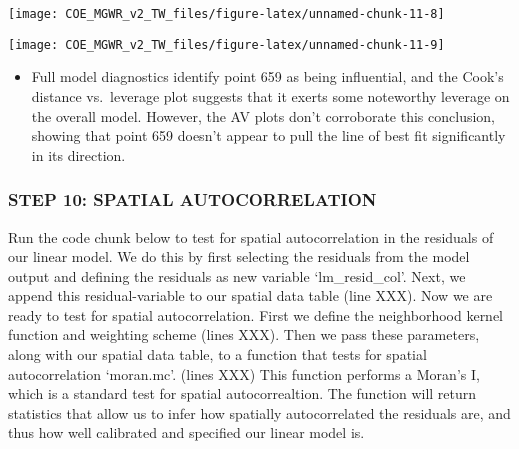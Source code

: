 \documentclass[
  12pt,
]{article}
\providecommand{\tightlist}{%
  \setlength{\itemsep}{0pt}\setlength{\parskip}{0pt}}
\begin{document}
\begin{center}\texttt{[image: COE\_MGWR\_v2\_TW\_files/figure-latex/unnamed-chunk-11-8]} \end{center}

\begin{center}\texttt{[image: COE\_MGWR\_v2\_TW\_files/figure-latex/unnamed-chunk-11-9]} \end{center}

\begin{itemize}
\tightlist
\item
  Full model diagnostics identify point 659 as being influential, and
  the Cook's distance vs.~leverage plot suggests that it exerts some
  noteworthy leverage on the overall model. However, the AV plots don't
  corroborate this conclusion, showing that point 659 doesn't appear to
  pull the line of best fit significantly in its direction.
\end{itemize}

\hypertarget{step-10-spatial-autocorrelation}{%
\subsubsection{STEP 10: SPATIAL
AUTOCORRELATION}\label{step-10-spatial-autocorrelation}}

Run the code chunk below to test for spatial autocorrelation in the
residuals of our linear model. We do this by first selecting the
residuals from the model output and defining the residuals as new
variable `lm\_resid\_col'. Next, we append this residual-variable to our
spatial data table (line XXX). Now we are ready to test for spatial
autocorrelation. First we define the neighborhood kernel function and
weighting scheme (lines XXX). Then we pass these parameters, along with
our spatial data table, to a function that tests for spatial
autocorrelation `moran.mc'. (lines XXX) This function performs a Moran's
I, which is a standard test for spatial autocorrealtion. The function
will return statistics that allow us to infer how spatially
autocorrelated the residuals are, and thus how well calibrated and
specified our linear model is.
\end{document}
